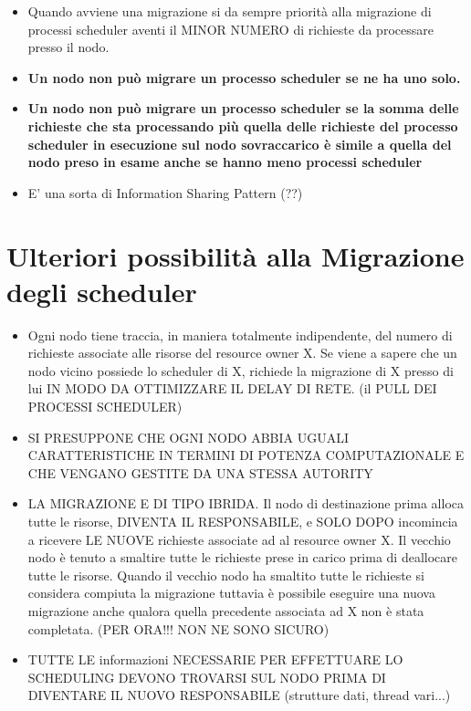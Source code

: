 \documentclass[10pt,a4paper]{report}
\begin{document}
\begin{itemize}
\item Quando avviene una migrazione si da sempre priorità alla migrazione di processi scheduler aventi il MINOR NUMERO di richieste da processare presso il nodo. 

\item \textbf{Un nodo non può migrare un processo scheduler se ne ha uno solo.}

\item \textbf{Un nodo non può migrare un processo scheduler se la somma delle richieste che sta processando più quella delle richieste del processo scheduler in esecuzione sul nodo sovraccarico è simile a quella del nodo preso in esame anche se hanno meno processi scheduler}

\item E' una sorta di Information Sharing Pattern (??)
\end{itemize}

\section{Ulteriori possibilità alla Migrazione degli scheduler}

\begin{itemize}
\item Ogni nodo tiene traccia, in maniera totalmente indipendente, del numero di richieste 
associate alle risorse del resource owner X. Se viene a sapere che un nodo vicino possiede lo scheduler di X, richiede la migrazione di X presso di lui IN MODO DA OTTIMIZZARE IL DELAY DI RETE. (il PULL DEI PROCESSI SCHEDULER)

\item SI PRESUPPONE CHE OGNI NODO ABBIA UGUALI CARATTERISTICHE IN TERMINI DI POTENZA COMPUTAZIONALE E CHE VENGANO GESTITE DA UNA STESSA AUTORITY

\item LA MIGRAZIONE E DI TIPO IBRIDA. Il nodo di destinazione prima alloca tutte le risorse, DIVENTA IL RESPONSABILE, e SOLO DOPO incomincia a ricevere LE NUOVE richieste associate ad al resource owner X. Il vecchio nodo è tenuto a smaltire tutte le richieste prese in carico prima di deallocare tutte le risorse. Quando il vecchio nodo ha smaltito tutte le richieste si considera compiuta la migrazione tuttavia è possibile eseguire una nuova migrazione anche qualora quella precedente associata ad X non è stata completata. (PER ORA!!! NON NE SONO SICURO)

\item TUTTE LE informazioni NECESSARIE PER EFFETTUARE LO SCHEDULING DEVONO TROVARSI SUL NODO PRIMA DI DIVENTARE IL NUOVO RESPONSABILE (strutture dati, thread vari...)
\end{itemize}
\end{document}
